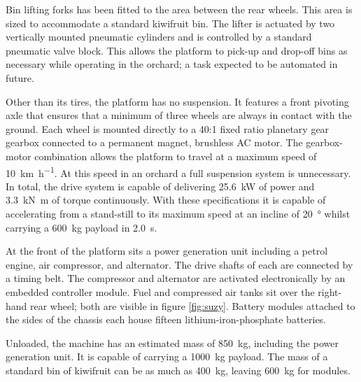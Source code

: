 \documentclass[preprint,authoryear,12pt]{elsarticle}
\begin{document}
    Bin lifting forks has been fitted to the area between the rear wheels.
    This area is sized to accommodate a standard kiwifruit bin.
    The lifter is actuated by two vertically mounted pneumatic cylinders and is controlled by a standard pneumatic valve block.
    This allows the platform to pick-up and drop-off bins as necessary while operating in the orchard; a task expected to be automated in future.

    Other than its tires, the platform has no suspension.
    It features a front pivoting axle that ensures that a minimum of three wheels are always in contact with the ground.
    Each wheel is mounted directly to a 40:1 fixed ratio planetary gear gearbox connected to a permanent magnet, brushless AC motor.
    The gearbox-motor combination allows the platform to travel at a maximum speed of \SI{10}{\kilo\meter\per\hour}.
    At this speed in an orchard a full suspension system is unnecessary.
    In total, the drive system is capable of delivering \SI{25.6}{\kilo\watt} of power and \SI{3.3}{\kilo\newton\meter} of torque continuously.
    With these specifications it is capable of accelerating from a stand-still to its maximum speed at an incline of \SI{20}{\degree} whilst carrying a \SI{600}{\kilo\gram} payload in \SI{2.0}{\second}.

    At the front of the platform sits a power generation unit including a petrol engine, air compressor, and alternator.
    The drive shafts of each are connected by a timing belt.
    The compressor and alternator are activated electronically by an embedded controller module.
    Fuel and compressed air tanks sit over the right-hand rear wheel; both are visible in figure \ref{fig:suzy}.
    Battery modules attached to the sides of the chassis each house fifteen lithium-iron-phosphate batteries.

    Unloaded, the machine has an estimated mass of \SI{850}{\kilo\gram}, including the power generation unit.
    It is capable of carrying a \SI{1000}{\kilo\gram} payload.
    The mass of a standard bin of kiwifruit can be as much as \SI{400}{\kilo\gram}, leaving \SI{600}{\kilo\gram} for modules.
\end{document}
